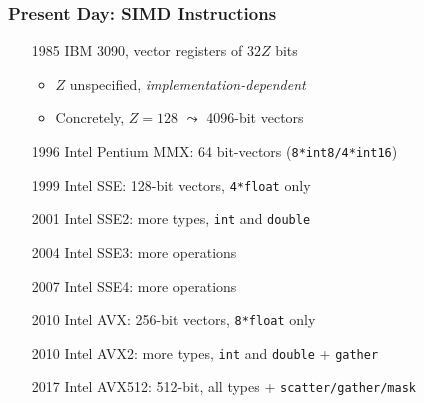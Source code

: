 \documentclass[xcolor={x11names,svgnames}]{beamer}
\begin{document}
\begin{frame}
  \frametitle{Present Day: SIMD Instructions}

  \begin{enumerate}
  \item[1985] IBM 3090, vector registers of $32 Z$ bits
    \begin{itemize}
    \item $Z$ \alert{unspecified}, \textit{implementation-dependent}
    \item Concretely, $Z=128$ $\leadsto$ 4096-bit vectors
    \end{itemize}
  \end{enumerate}

  \medskip
    \begin{overlayarea}{\textwidth}{6cm}
    \pause
    \pause

    \begin{enumerate}  
    \item[1996] Intel Pentium MMX: 64 bit-vectors (\texttt{8*int8/4*int16})
      \pause
    \item[1999] Intel SSE: 128-bit vectors, \texttt{4*float} only
    \item[2001] Intel SSE2: more types, \texttt{int} and \texttt{double}
    \item[2004] Intel SSE3: more operations
    \item[2007] Intel SSE4: more operations
    \item[2010] Intel AVX: 256-bit vectors, \texttt{8*float} only
    \item[2010] Intel AVX2: more types, \texttt{int} and \texttt{double} + \texttt{gather}
    \item[2017] Intel AVX512: 512-bit, all types + \texttt{scatter/gather/mask}
  \end{enumerate}
\end{overlayarea}

\end{frame}
\end{document}
